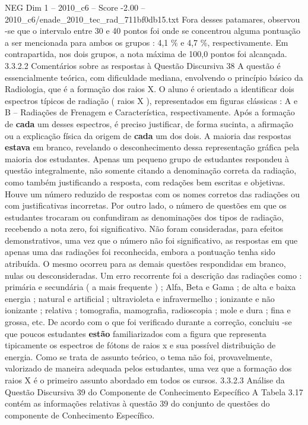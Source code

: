 \begin{textsample}{NEG Dim 1 – 2010\_c6 – Score -2.00 – 2010\_c6/enade\_2010\_tec\_rad\_711bf0db15.txt}
Fora desses patamares, observou -se que o intervalo entre 30 e 40 pontos foi onde se concentrou alguma pontuação a ser mencionada para ambos os grupos : 4,1 \% e 4,7 \%, respectivamente.
Em contrapartida, nos dois grupos, a nota máxima de 100,0 pontos foi alcançada. 3.3.2.2 Comentários sobre as respostas à Questão Discursiva 38 A questão é essencialmente teórica, com dificuldade mediana, envolvendo o princípio básico da Radiologia, que é a formação dos raios X.
O aluno é orientado a identificar dois espectros típicos de radiação ( raios X ), representados em figuras clássicas : A e B – Radiações de Frenagem e Característica, respectivamente.
Após a formação de \textbf{cada} um desses espectros, é preciso justificar, de forma sucinta, a afirmação ou a explicação física da origem de \textbf{cada} um dos dois.
A maioria das respostas \textbf{estava} em branco, revelando o desconhecimento dessa representação gráfica pela maioria dos estudantes.
Apenas um pequeno grupo de estudantes respondeu à questão integralmente, não somente citando a denominação correta da radiação, como também justificando a resposta, com redações bem escritas e objetivas.
Houve um número reduzido de respostas com os nomes corretos das radiações ou com justificativas incorretas.
Por outro lado, o número de questões em que os estudantes trocaram ou confundiram as denominações dos tipos de radiação, recebendo a nota zero, foi significativo.
Não foram consideradas, para efeitos demonstrativos, uma vez que o número não foi significativo, as respostas em que apenas uma das radiações foi reconhecida, embora a pontuação tenha sido atribuída.
O mesmo ocorreu para as demais questões respondidas em branco, nulas ou desconsideradas.
Um erro recorrente foi a descrição das radiações como : primária e secundária ( a mais frequente ) ; Alfa, Beta e Gama ; de alta e baixa energia ; natural e artificial ; ultravioleta e infravermelho ; ionizante e não ionizante ; relativa ; tomografia, mamografia, radioscopia ; mole e dura ; fina e grossa, etc.
De acordo com o que foi verificado durante a correção, concluiu -se que poucos estudantes \textbf{estão} familiarizados com a figura que representa tipicamente os espectros de fótons de raios x e sua possível distribuição de energia.
Como se trata de assunto teórico, o tema não foi, provavelmente, valorizado de maneira adequada pelos estudantes, uma vez que a formação dos raios X é o primeiro assunto abordado em todos os cursos. 3.3.2.3 Análise da Questão Discursiva 39 do Componente de Conhecimento Específico A Tabela 3.17 contém as informações relativas à questão 39 do conjunto de questões do componente de Conhecimento Específico.

\end{textsample}
